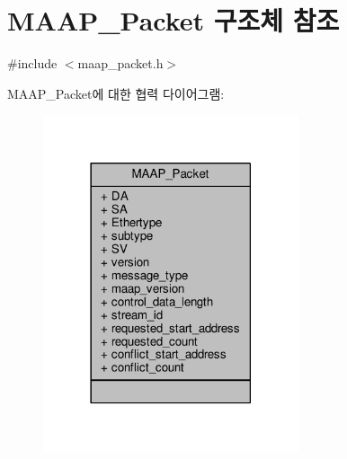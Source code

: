 \hypertarget{struct_m_a_a_p___packet}{}\section{M\+A\+A\+P\+\_\+\+Packet 구조체 참조}
\label{struct_m_a_a_p___packet}


{\ttfamily \#include $<$maap\+\_\+packet.\+h$>$}



M\+A\+A\+P\+\_\+\+Packet에 대한 협력 다이어그램\+:
\nopagebreak
\begin{figure}[H]
\begin{center}
\leavevmode
\includegraphics[width=213pt]{struct_m_a_a_p___packet__coll__graph}
\end{center}
\end{figure}
